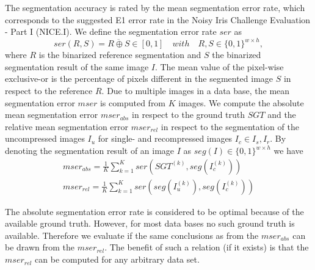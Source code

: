 \documentclass[10pt,twocolumn,letterpaper]{article}
\begin{document}
The segmentation accuracy is rated by the mean segmentation error rate, which corresponds to the suggested E1 error rate in the Noisy Iris Challenge Evaluation - Part I (NICE.I). We define the segmentation error rate $ser$ as
\begin{equation}
ser(R,S) = \overline{R \oplus S} \in [0,1]\quad with \quad R,S \in \{0,1\}^{w \times h},
\end{equation} where $R$ is the binarized reference segmentation and $S$ the binarized segmentation result of the same image $I$. The mean value of the pixel-wise exclusive-or is the percentage of pixels different in the segmented image $S$ in respect to the reference $R$. Due to multiple images in a data base, the mean segmentation error $mser$ is computed from $K$ images. We compute the absolute mean segmentation error $mser_{abs}$ in respect to the ground truth $SGT$ and the relative mean segmentation error $mser_{rel}$ in respect to the segmentation of the uncompressed images $I_u$ for single- and recompressed images $I_c \in {I_s, I_r}$. By denoting the segmentation result of an image $I$ as $seg(I) \in \{0,1\}^{w \times h}$ we have
\begin{eqnarray}
mser_{abs} = \frac{1}{K}\sum_{k=1}^{K}ser(SGT^{(k)},seg(I_c^{(k)})) \label{equ:mserabs} \\
mser_{rel} = \frac{1}{K}\sum_{k=1}^{K}ser(seg(I_u^{(k)}),seg(I_c^{(k)})) \label{equ:mserrel}
\end{eqnarray}

The absolute segmentation error rate is considered to be optimal because of the available ground truth. However, for most data bases no such ground truth is available. Therefore we evaluate if the same conclusions as from the $mser_{abs}$ can be drawn from the $mser_{rel}$. The benefit of such a relation (if it exists) is that the $mser_{rel}$ can be computed for any arbitrary data set. 
\end{document}
